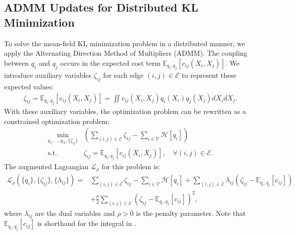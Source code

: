 \subsection{ADMM Updates for Distributed KL Minimization}
\label{subsec:admm_updates}

To solve the mean-field KL minimization problem  in a distributed manner, we apply the Alternating Direction Method of Multipliers (ADMM). The coupling between $q_i$ and $q_j$ occurs in the expected cost term $\mathbb{E}_{q_i, q_j}[c_{ij}(X_i, X_j)]$. We introduce auxiliary variables $\zeta_{ij}$ for each edge $(i,j) \in {\mathcal{E}}$ to represent these expected values:
\begin{equation}
\begin{aligned}
\zeta_{ij} = \mathbb{E}_{q_i, q_j}[c_{ij}(X_i, X_j)] = \iint c_{ij}(X_i, X_j) q_i(X_i) q_j(X_j) dX_i dX_j.
\label{eq:aux_variable_zeta}
\end{aligned}
\end{equation}
With these auxiliary variables, the optimization problem  can be rewritten as a constrained optimization problem:
\begin{equation}
\begin{aligned}
\min_{q_1, \dots, q_N, \{\zeta_{ij}\}} & \left( \sum_{(i,j) \in {\mathcal{E}}} \zeta_{ij} - \sum_{i \in {\mathcal{V}}} {\mathcal{H}}[q_i] \right) \\
\text{s.t.} \quad & \zeta_{ij} = \mathbb{E}_{q_i, q_j}[c_{ij}(X_i, X_j)], \quad \forall (i,j) \in {\mathcal{E}}.
\label{eq:kl_min_constrained}
\end{aligned}
\end{equation}
The augmented Lagrangian ${\mathcal{L}}_{\rho}$ for this problem is:
\begin{equation}
\begin{aligned}
{\mathcal{L}}_{\rho}(\{q_i\}, \{\zeta_{ij}\}, \{\lambda_{ij}\}) = & \sum_{(i,j) \in {\mathcal{E}}} \zeta_{ij} - \sum_{i \in {\mathcal{V}}} {\mathcal{H}}[q_i] + \sum_{(i,j) \in {\mathcal{E}}} \lambda_{ij} (\zeta_{ij} - \mathbb{E}_{q_i, q_j}[c_{ij}]) \\
& + \frac{\rho}{2} \sum_{(i,j) \in {\mathcal{E}}} (\zeta_{ij} - \mathbb{E}_{q_i, q_j}[c_{ij}])^2,
\label{eq:admm_kl_lagrangian}
\end{aligned}
\end{equation}
where $\lambda_{ij}$ are the dual variables and $\rho > 0$ is the penalty parameter. Note that $\mathbb{E}_{q_i, q_j}[c_{ij}]$ is shorthand for the integral in .

